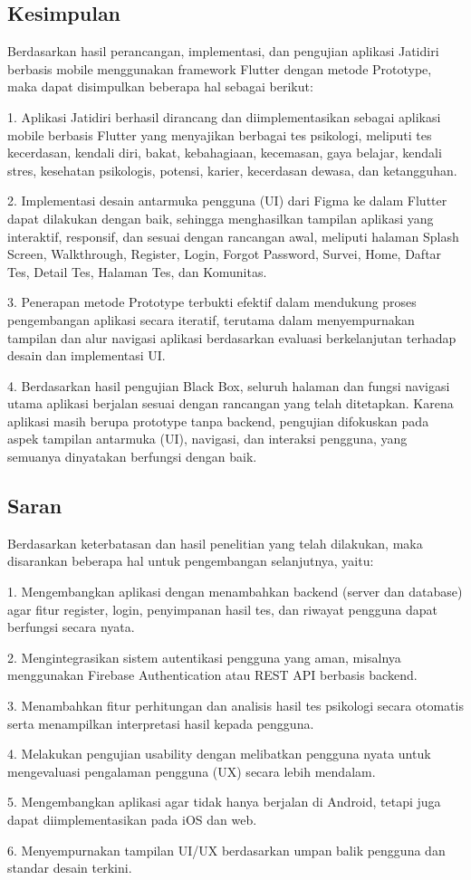 \subsection{Kesimpulan}

Berdasarkan hasil perancangan, implementasi, dan pengujian aplikasi Jatidiri berbasis mobile menggunakan framework Flutter dengan metode Prototype, maka dapat disimpulkan beberapa hal sebagai berikut:

1. Aplikasi Jatidiri berhasil dirancang dan diimplementasikan sebagai aplikasi mobile berbasis Flutter yang menyajikan berbagai tes psikologi, meliputi tes kecerdasan, kendali diri, bakat, kebahagiaan, kecemasan, gaya belajar, kendali stres, kesehatan psikologis, potensi, karier, kecerdasan dewasa, dan ketangguhan.

2. Implementasi desain antarmuka pengguna (UI) dari Figma ke dalam Flutter dapat dilakukan dengan baik, sehingga menghasilkan tampilan aplikasi yang interaktif, responsif, dan sesuai dengan rancangan awal, meliputi halaman Splash Screen, Walkthrough, Register, Login, Forgot Password, Survei, Home, Daftar Tes, Detail Tes, Halaman Tes, dan Komunitas.

3. Penerapan metode Prototype terbukti efektif dalam mendukung proses pengembangan aplikasi secara iteratif, terutama dalam menyempurnakan tampilan dan alur navigasi aplikasi berdasarkan evaluasi berkelanjutan terhadap desain dan implementasi UI.

4. Berdasarkan hasil pengujian Black Box, seluruh halaman dan fungsi navigasi utama aplikasi berjalan sesuai dengan rancangan yang telah ditetapkan. Karena aplikasi masih berupa prototype tanpa backend, pengujian difokuskan pada aspek tampilan antarmuka (UI), navigasi, dan interaksi pengguna, yang semuanya dinyatakan berfungsi dengan baik.


\subsection{Saran}

Berdasarkan keterbatasan dan hasil penelitian yang telah dilakukan, maka disarankan beberapa hal untuk pengembangan selanjutnya, yaitu:

1. Mengembangkan aplikasi dengan menambahkan backend (server dan database) agar fitur register, login, penyimpanan hasil tes, dan riwayat pengguna dapat berfungsi secara nyata.

2. Mengintegrasikan sistem autentikasi pengguna yang aman, misalnya menggunakan Firebase Authentication atau REST API berbasis backend.

3. Menambahkan fitur perhitungan dan analisis hasil tes psikologi secara otomatis serta menampilkan interpretasi hasil kepada pengguna.

4. Melakukan pengujian usability dengan melibatkan pengguna nyata untuk mengevaluasi pengalaman pengguna (UX) secara lebih mendalam.

5. Mengembangkan aplikasi agar tidak hanya berjalan di Android, tetapi juga dapat diimplementasikan pada iOS dan web.

6. Menyempurnakan tampilan UI/UX berdasarkan umpan balik pengguna dan standar desain terkini.
